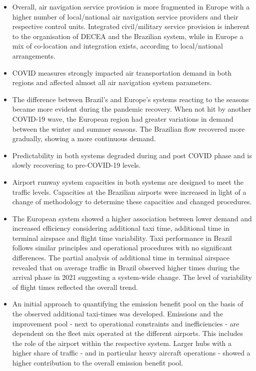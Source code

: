 \documentclass[
  a4paper,
  DIV=11,
  numbers=noendperiod]{scrreprt}
\providecommand{\tightlist}{%
  \setlength{\itemsep}{0pt}\setlength{\parskip}{0pt}}\usepackage{longtable,booktabs,array}
\begin{document}
\begin{itemize}
\tightlist
\item
  Overall, air navigation service provision is more fragmented in Europe
  with a higher number of local/national air navigation service
  providers and their respective control units. Integrated
  civil/military service provision is inherent to the organisation of
  DECEA and the Brazilian system, while in Europe a mix of co-location
  and integration exists, according to local/national arrangements.
\item
  COVID measures strongly impacted air transportation demand in both
  regions and affected almost all air navigation system parameters.
\item
  The difference between Brazil's and Europe's systems reacting to the
  seasons became more evident during the pandemic recovery. When not hit
  by another COVID-19 wave, the European region had greater variations
  in demand between the winter and summer seasons. The Brazilian flow
  recovered more gradually, showing a more continuous demand.
\item
  Predictability in both systems degraded during and post COVID phase
  and is slowly recovering to pre-COVID-19 levels.
\item
  Airport runway system capacities in both systems are designed to meet
  the traffic levels. Capacities at the Brazilian airports were
  increased in light of a change of methodology to determine these
  capacities and changed procedures.
\item
  The European system showed a higher association between lower demand
  and increased efficiency considering additional taxi time, additional
  time in terminal airspace and flight time variability. Taxi
  performance in Brazil follows similar principles and operational
  procedures with no significant differences. The partial analysis of
  additional time in terminal airspace revealed that on average traffic
  in Brazil observed higher times during the arrival phase in 2021
  suggesting a system-wide change. The level of variability of flight
  times reflected the overall trend.
\item
  An initial approach to quantifying the emission benefit pool on the
  basis of the observed additional taxi-times was developed. Emissions
  and the improvement pool - next to operational constraints and
  inefficiencies - are dependent on the fleet mix operated at the
  different airports. This includes the role of the airport within the
  respective system. Larger hubs with a higher share of traffic - and in
  particular heavy aircraft operations - showed a higher contribution to
  the overall emission benefit pool.
\end{itemize}
\end{document}
